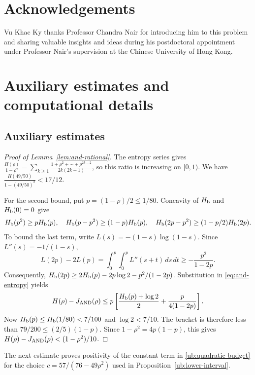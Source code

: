 \documentclass[11pt,letterpaper]{amsart}
\newcommand{\1}{\mathbf 1}
\numberwithin{equation}{section}
\begin{document}
\section*{Acknowledgements}

Vu Khac Ky thanks Professor Chandra Nair for introducing him to this problem and sharing valuable insights and ideas during his postdoctoral appointment under Professor Nair's supervision at the Chinese University of Hong Kong.






\appendix

\section{Auxiliary estimates and computational details}
\label{sec:certificates}\label{app:certificate}

\subsection{Auxiliary estimates}
\label{app:auxiliary-estimates}

\begin{proof}[Proof of Lemma~\ref{lem:and-rational}]
The entropy series gives
$\frac{H(\rho)}{1-\rho^2}
 =\sum_{k\ge1}
   \frac{1+\rho^2+\cdots+\rho^{2k-2}}{2k(2k-1)}$,
so this ratio is increasing on $[0,1)$.
We have
$\frac{H(49/50)}{1-(49/50)^2}<17/12$.

For the second bound, put $p=(1-\rho)/2\le1/80$.
Concavity of $H_{\rm b}$ and $H_{\rm b}(0)=0$ give
\[
 H_{\rm b}(p^2)\ge pH_{\rm b}(p),\quad
 H_{\rm b}(p-p^2)\ge(1-p)H_{\rm b}(p),\quad
 H_{\rm b}(2p-p^2)\ge(1-p/2)H_{\rm b}(2p).
\]
To bound the last term, write
$L(s)=-(1-s)\log(1-s)$.
Since $L''(s)=-1/(1-s)$,
\[
 L(2p)-2L(p)
 =\int_0^p\int_0^p L''(s+t)\,ds\,dt
 \ge-\frac{p^2}{1-2p}.
\]
Consequently,
$H_{\rm b}(2p)\ge
2H_{\rm b}(p)-2p\log2-p^2/(1-2p)$.
Substitution in \eqref{eq:and-entropy} yields
\[
 H(\rho)-J_{\rm AND}(\rho)
 \le p\left[
       \frac{H_{\rm b}(p)+\log2}{2}
       +\frac{p}{4(1-2p)}
      \right].
\]
Now $H_{\rm b}(p)\le H_{\rm b}(1/80)<7/100$ and
$\log2<7/10$.
The bracket is therefore less than
$79/200\le(2/5)(1-p)$.
Since $1-\rho^2=4p(1-p)$, this gives
$H(\rho)-J_{\rm AND}(\rho)<(1-\rho^2)/10$.
\end{proof}

The next estimate proves positivity of the constant term in
\eqref{ub:quadratic-budget} for the choice
$c=57/(76-49\rho^2)$ used in
Proposition~\ref{ub:lower-interval}.
\end{document}
